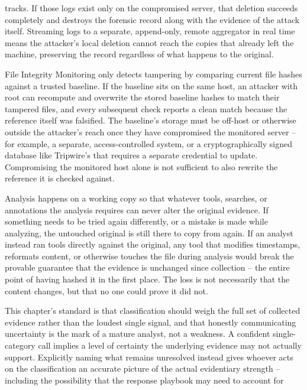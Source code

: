 \begin{answerkey}
tracks. If those logs exist only on the compromised server, that deletion succeeds completely and
destroys the forensic record along with the evidence of the attack itself. Streaming logs to a
separate, append-only, remote aggregator in real time means the attacker's local deletion cannot
reach the copies that already left the machine, preserving the record regardless of what happens to
the original.
\item File Integrity Monitoring only detects tampering by comparing current file hashes against a
trusted baseline. If the baseline sits on the same host, an attacker with root can recompute and
overwrite the stored baseline hashes to match their tampered files, and every subsequent check
reports a clean match because the reference itself was falsified. The baseline's storage must be
off-host or otherwise outside the attacker's reach once they have compromised the monitored server
-- for example, a separate, access-controlled system, or a cryptographically signed database like
Tripwire's that requires a separate credential to update. Compromising the monitored host alone is
not sufficient to also rewrite the reference it is checked against.
\item Analysis happens on a working copy so that whatever tools, searches, or annotations the
analysis requires can never alter the original evidence. If something needs to be tried again
differently, or a mistake is made while analyzing, the untouched original is still there to copy
from again. If an analyst instead ran tools directly against the original, any tool that modifies
timestamps, reformats content, or otherwise touches the file during analysis would break the
provable guarantee that the evidence is unchanged since collection -- the entire point of having
hashed it in the first place. The loss is not necessarily that the content changes, but that no one
could prove it did not.
\item This chapter's standard is that classification should weigh the full set of collected
evidence rather than the loudest single signal, and that honestly communicating uncertainty is the
mark of a mature analyst, not a weakness. A confident single-category call implies a level of
certainty the underlying evidence may not actually support. Explicitly naming what remains
unresolved instead gives whoever acts on the classification an accurate picture of the actual
evidentiary strength -- including the possibility that the response playbook may need to account for

\end{answerkey}
